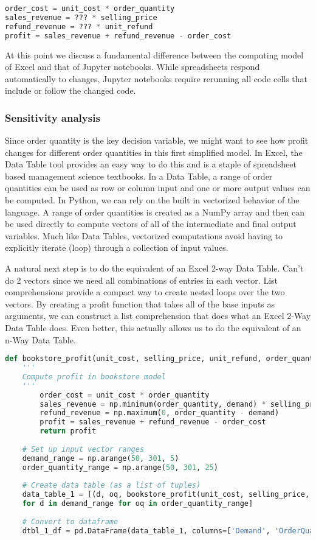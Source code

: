 \documentclass[ited,blindrev]{informs3}              %
\begin{document}
\begin{lstlisting}[language=Python]
order_cost = unit_cost * order_quantity
sales_revenue = ??? * selling_price
refund_revenue = ??? * unit_refund
profit = sales_revenue + refund_revenue - order_cost
\end{lstlisting}

At this point we discuss a fundamental difference between the computing model of Excel and that of Jupyter notebooks. While spreadsheets respond automatically to changes, Jupyter notebooks require rerunning all code cells that include or follow the changed code.

\subsubsection{Sensitivity analysis}

Since order quantity is the key decision variable, we might want to see how profit changes for different order quantities in this first simplified model. In Excel, the Data Table tool provides an easy way to do this and is a staple of spreadsheet based management science textbooks. In a Data Table, a range of order quantities can be used as row or column input and one or more output values can be computed. In Python, we can rely on the built in vectorized behavior of the language. A range of order quantities is created as a NumPy array and then can be used directly to compute vectors of all of the intermediate and final output variables. Much like Data Tables, vectorized computations avoid having to explicitly iterate (loop) through a collection of input values.

A natural next step is to do the equivalent of an Excel 2-way Data Table. Can't do 2 vectors since we need all combinations of entries in each vector. List comprehensions provide a compact way to create nested loops over the two vectors. By creating a profit function that takes all of the base inputs as arguments, we can construct a list comprehension that does what an Excel 2-Way Data Table does. Even better, this actually allows us to do the equivalent of an n-Way Data Table.

\begin{lstlisting}[language=Python]
	def bookstore_profit(unit_cost, selling_price, unit_refund, order_quantity, demand):
	'''
	Compute profit in bookstore model
	'''
		order_cost = unit_cost * order_quantity
		sales_revenue = np.minimum(order_quantity, demand) * selling_price
		refund_revenue = np.maximum(0, order_quantity - demand)
		profit = sales_revenue + refund_revenue - order_cost
		return profit
	
	# Set up input vector ranges	
	demand_range = np.arange(50, 301, 5)
	order_quantity_range = np.arange(50, 301, 25)
	
	# Create data table (as a list of tuples)
	data_table_1 = [(d, oq, bookstore_profit(unit_cost, selling_price, unit_refund, oq, d)) 
	for d in demand_range for oq in order_quantity_range]
	
	# Convert to dataframe
	dtbl_1_df = pd.DataFrame(data_table_1, columns=['Demand', 'OrderQuantity', 'Profit'])
	
\end{lstlisting}
\end{document}

